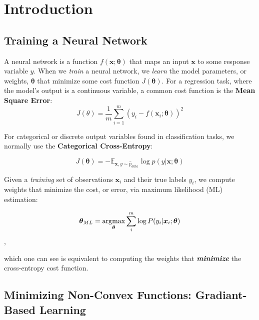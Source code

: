 
\chapter{Introduction}
\section{Training a Neural Network}
A neural network is a function $f(\bm{x};\bm{\theta})$ that maps an input $\bm{x}$ to some response variable $y$. When we \textit{train} a
neural network, we \textit{learn} the model parameters, or weights, $\bm{\theta}$ that minimize some cost function $J(\bm{\theta})$.
For a regression task, where the model's output is a continuous variable, a common cost function is the \textbf{Mean Square Error}:
\[J(\theta) = \frac{1}{m}\sum_{i=1}^{m}(y_{i} - f(\bm{x}_{i};\bm{\theta}))^{2}\]

For categorical or discrete output variables found in classification tasks, we normally use the \textbf{Categorical Cross-Entropy}:

\[J(\bm{\theta}) = -\mathbb{E}_{\bm{x},y \sim \hat p_{data}} \log \textit{p}(y|\bm{x};\bm{\theta})\]

Given a \textit{training} set of observations $\bm{x}_i$ and their true labels $y_i$, we compute weights that minimize the cost, or error, via
maximum likelihood (ML) estimation:

\[\bm{\theta}_{ML} = \operatorname*{\arg\!\max}_{\bm{\theta}} \sum_{i}^{m} \log P(y_{i}|\bm{x}_{i};\bm{\theta})\],

which one can see is equivalent to computing the weights that \textbf{\textit{minimize}} the cross-entropy cost function.


\section{Minimizing Non-Convex Functions: Gradiant-Based Learning}

